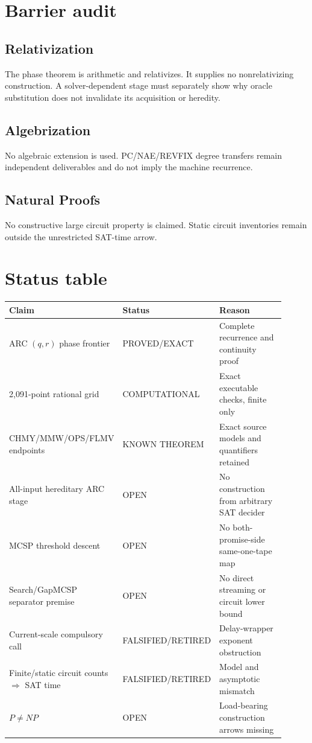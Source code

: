 \documentclass[11pt]{article}
\begin{document}
\section*{Barrier audit}
\subsection*{Relativization}
The phase theorem is arithmetic and relativizes.  It supplies no
nonrelativizing construction.  A solver-dependent stage must separately show
why oracle substitution does not invalidate its acquisition or heredity.

\subsection*{Algebrization}
No algebraic extension is used.  PC/NAE/REVFIX degree transfers remain
independent deliverables and do not imply the machine recurrence.

\subsection*{Natural Proofs}
No constructive large circuit property is claimed.  Static circuit inventories
remain outside the unrestricted SAT-time arrow.

\section*{Status table}
\begin{center}
\begin{tabular}{p{0.27\linewidth}p{0.17\linewidth}p{0.47\linewidth}}
\toprule
Claim & Status & Reason \\
\midrule
ARC $(q,r)$ phase frontier & PROVED/EXACT & Complete recurrence and continuity proof \\
2,091-point rational grid & COMPUTATIONAL & Exact executable checks, finite only \\
CHMY/MMW/OPS/FLMV endpoints & KNOWN THEOREM & Exact source models and quantifiers retained \\
All-input hereditary ARC stage & OPEN & No construction from arbitrary SAT decider \\
MCSP threshold descent & OPEN & No both-promise-side same-one-tape map \\
Search/GapMCSP separator premise & OPEN & No direct streaming or circuit lower bound \\
Current-scale compulsory call & FALSIFIED/RETIRED & Delay-wrapper exponent obstruction \\
Finite/static circuit counts $\Rightarrow$ SAT time & FALSIFIED/RETIRED & Model and asymptotic mismatch \\
$P\ne NP$ & OPEN & Load-bearing construction arrows missing \\
\bottomrule
\end{tabular}
\end{center}
\end{document}
